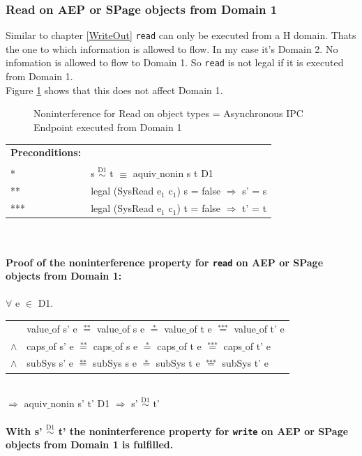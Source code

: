 \documentclass[11pt,a4paper,twoside]{article}
\begin{document}
{\subsubsection{Read on AEP or SPage objects from Domain 1}
Similar to chapter \ref{WriteOut} \texttt{read} can only be executed from a H domain. Thats the one to which information is allowed to flow. In my case it's Domain 2. No infomation is allowed to flow to Domain 1. So \texttt{read} is not legal if it is executed from Domain 1.\\
Figure \ref{fig:ReadOut} shows that this does not affect Domain 1. 
\begin{flushleft}
\begin{figure}[H]
\caption{Noninterference for Read on object types = Asynchronous IPC Endpoint executed from Domain 1}
\label{fig:ReadOut}
\end{figure}
\end{flushleft} 
\begin{tabular}{ll}
\textbf{Preconditions:} \\ \\
* & s $\overset{\text{D1}}{\sim}$ t $\equiv$ aquiv$\_$nonin s t D1	\\ 
** & legal (SysRead e$_1$ c$_1$) s = false $\Rightarrow$ s' = s \\ 
*** & legal (SysRead e$_1$ c$_1$) t = false $\Rightarrow$ t' = t
\end{tabular} \\ \\ 
\textbf{Proof of the noninterference property for \texttt{read} on AEP or SPage objects from Domain 1:}\\ \\
$\forall$ e $\in$ D1. \\ 
\begin{tabular}{ll}
& value$\_$of s' e $\overset{\text{**}}{=}$ value$\_$of s e $\overset{\text{*}}{=}$ value$\_$of t e $\overset{\text{***}}{=}$ value$\_$of t' e \\
$\wedge$ & caps$\_$of s' e $\overset{\text{**}}{=}$ caps$\_$of s e $\overset{\text{*}}{=}$ caps$\_$of t e $\overset{\text{***}}{=}$ caps$\_$of t' e \\
$\wedge$ & subSys s' e $\overset{\text{**}}{=}$ subSys s e $\overset{\text{*}}{=}$ subSys t e $\overset{\text{***}}{=}$ subSys t' e
\end{tabular} \\
$\Rightarrow$ aquiv$\_$nonin s' t' D1 $\Rightarrow$ s' $\overset{\text{D1}}{\sim}$ t' \\ \\
\textbf{With s' $\overset{\text{D1}}{\sim}$ t' the noninterference property for \texttt{write} on AEP or SPage objects from Domain 1 is fulfilled.}  
\clearpage
}
\end{document}
